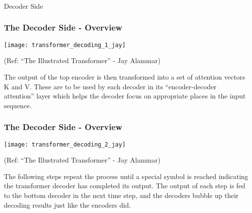 \begin{frame}[fragile]\frametitle{}
\begin{center}
{\Large Decoder Side}
\end{center}
\end{frame}

\begin{frame}[fragile]\frametitle{The Decoder Side - Overview}


\begin{center}
\texttt{[image: transformer\_decoding\_1\_jay]}


{\tiny (Ref: ``The Illustrated Transformer'' - Jay Alammar)}
\end{center}	


The output of the top encoder is then transformed into a set of attention vectors K and V. These are to be used by each decoder in its ``encoder-decoder attention'' layer which helps the decoder focus on appropriate places in the input sequence.

\end{frame}

\begin{frame}[fragile]\frametitle{The Decoder Side - Overview}


\begin{center}
\texttt{[image: transformer\_decoding\_2\_jay]}


{\tiny (Ref: ``The Illustrated Transformer'' - Jay Alammar)}
\end{center}	


The following steps repeat the process until a special symbol is reached indicating the transformer decoder has completed its output. The output of each step is fed to the bottom decoder in the next time step, and the decoders bubble up their decoding results just like the encoders did.
\end{frame}


